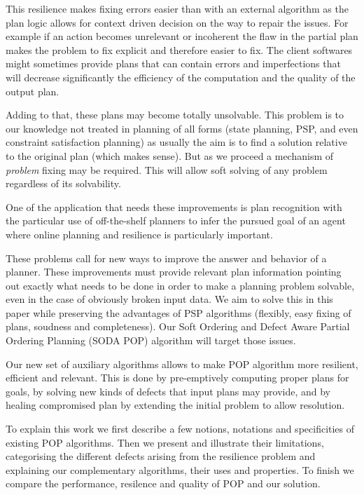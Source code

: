 \documentclass[]{article}
\begin{document}
This resilience makes fixing errors easier than with an external
algorithm as the plan logic allows for context driven decision on the
way to repair the issues. For example if an action becomes unrelevant or
incoherent the flaw in the partial plan makes the problem to fix
explicit and therefore easier to fix. The client softwares might
sometimes provide plans that can contain errors and imperfections that
will decrease significantly the efficiency of the computation and the
quality of the output plan.

Adding to that, these plans may become totally unsolvable. This problem
is to our knowledge not treated in planning of all forms (state
planning, PSP, and even constraint satisfaction planning) as usually the
aim is to find a solution relative to the original plan (which makes
sense). But as we proceed a mechanism of \emph{problem} fixing may be
required. This will allow soft solving of any problem regardless of its
solvability.

One of the application that needs these improvements is plan recognition
with the particular use of off-the-shelf planners to infer the pursued
goal of an agent where online planning and resilience is particularly
important.

These problems call for new ways to improve the answer and behavior of a
planner. These improvements must provide relevant plan information
pointing out exactly what needs to be done in order to make a planning
problem solvable, even in the case of obviously broken input data. We
aim to solve this in this paper while preserving the advantages of PSP
algorithms (flexibly, easy fixing of plans, soudness and completeness).
Our Soft Ordering and Defect Aware Partial Ordering Planning (SODA POP)
algorithm will target those issues.

Our new set of auxiliary algorithms allows to make POP algorithm more
resilient, efficient and relevant. This is done by pre-emptively
computing proper plans for goals, by solving new kinds of defects that
input plans may provide, and by healing compromised plan by extending
the initial problem to allow resolution.

To explain this work we first describe a few notions, notations and
specificities of existing POP algorithms. Then we present and illustrate
their limitations, categorising the different defects arising from the
resilience problem and explaining our complementary algorithms, their
uses and properties. To finish we compare the performance, resilence and
quality of POP and our solution.
\end{document}
